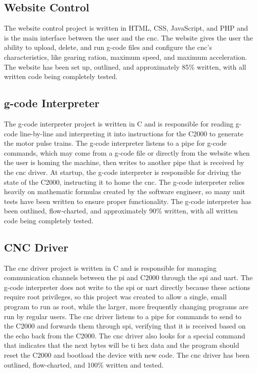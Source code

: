 \subsection{Website Control}
The website control project is written in HTML, CSS, JavaScript, and PHP and is the main interface between the user and the \gls{cnc}.
The website gives the user the ability to upload, delete, and run g-code files and configure the \gls{cnc}'s characteristics, like gearing ration, maximum speed, and maximum acceleration.
The website has been set up, outlined, and approximately 85\% written, with all written code being completely tested.

\subsection{g-code Interpreter}
The g-code interpreter project is written in C and is responsible for reading g-code line-by-line and interpreting it into instructions for the C2000 to generate the motor pulse trains.
The g-code interpreter listens to a pipe for g-code commands, which may come from a g-code file or directly from the website when the user is homing the machine, then writes to another pipe that is received by the \gls{cnc} driver.
At startup, the g-code interpreter is responsible for driving the state of the C2000, instructing it to home the \gls{cnc}.
The g-code interpreter relies heavily on mathematic formulas created by the software engineer, so many unit tests have been written to ensure proper functionality.
The g-code interpreter has been outlined, flow-charted, and approximately 90\% written, with all written code being completely tested.

\subsection{CNC Driver}
The \gls{cnc} driver project is written in C and is responsible for managing communication channels between the \gls{pi} and C2000 through the \gls{spi} and \gls{uart}.
The g-code interpreter does not write to the \gls{spi} or \gls{uart} directly because these actions require root privileges, so this project was created to allow a single, small program to run as root, while the larger, more frequently changing programs are run by regular users.
The \gls{cnc} driver listens to a pipe for commands to send to the C2000 and forwards them through \gls{spi}, verifying that it is received based on the echo back from the C2000.
The \gls{cnc} driver also looks for a special command that indicates that the next bytes will be \gls{ti} hex data and the program should reset the C2000 and bootload the device with new code.
The \gls{cnc} driver has been outlined, flow-charted, and 100\% written and tested.


